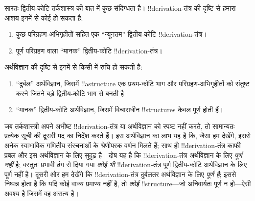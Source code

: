 \documentclass[../../../include/open-logic-section]{subfiles}
\begin{document}
सारतः द्वितीय-कोटि तर्कशास्त्र की बात में कुछ संदिग्धता है।
!!{derivation}-तंत्र की दृष्टि से हमारा आशय इनमें से कोई हो सकता है:
\begin{enumerate}
\item कुछ परिग्रहण-अभिगृहीतों सहित एक ``न्यूनतम'' द्वितीय-कोटि
  !!{derivation}-तंत्र।
\item पूर्ण परिग्रहण वाला ``मानक'' द्वितीय-कोटि !!{derivation}-तंत्र।
\end{enumerate}
अर्थविज्ञान की दृष्टि से इनमें से किसी में रुचि हो सकती है:
\begin{enumerate}
\item ``दुर्बल'' अर्थविज्ञान, जिसमें !!a{structure} एक प्रथम-कोटि भाग और
  परिग्रहण-अभिगृहीतों को संतुष्ट करने जितने बड़े द्वितीय-कोटि भाग से बनती है।
\item ``मानक'' द्वितीय-कोटि अर्थविज्ञान, जिसमें विचाराधीन !!{structure}s
  केवल पूर्ण होती हैं।
\end{enumerate}
जब तर्कशास्त्री अपने अभीष्ट !!{derivation}-तंत्र या अर्थविज्ञान को स्पष्ट
नहीं करते, तो सामान्यतः प्रत्येक सूची की दूसरी मद का निर्देश करते हैं। इस
अर्थविज्ञान का लाभ यह है कि, जैसा हम देखेंगे, इससे अनेक स्वाभाविक गणितीय
संरचनाओं के श्रेणीपरक वर्णन मिलते हैं; साथ ही !!{derivation}-तंत्र काफी
प्रबल और इस अर्थविज्ञान के लिए सुदृढ़ है। दोष यह है कि !!{derivation}-तंत्र
अर्थविज्ञान के लिए \emph{पूर्ण नहीं} है; वस्तुतः प्रभावी ढंग से दिया गया
\emph{कोई भी} !!{derivation}-तंत्र पूर्ण द्वितीय-कोटि अर्थविज्ञान के लिए
पूर्ण नहीं है। दूसरी ओर हम देखेंगे कि !!{derivation}-तंत्र दुर्बलतर
अर्थविज्ञान के लिए \emph{पूर्ण है}; इससे निष्पन्न होता है कि यदि कोई वाक्य
प्रमाण्य नहीं है, तो \emph{कोई} !!{structure}---जो अनिवार्यतः पूर्ण न
हो---ऐसी अवश्य है जिसमें वह असत्य है।
\end{document}
